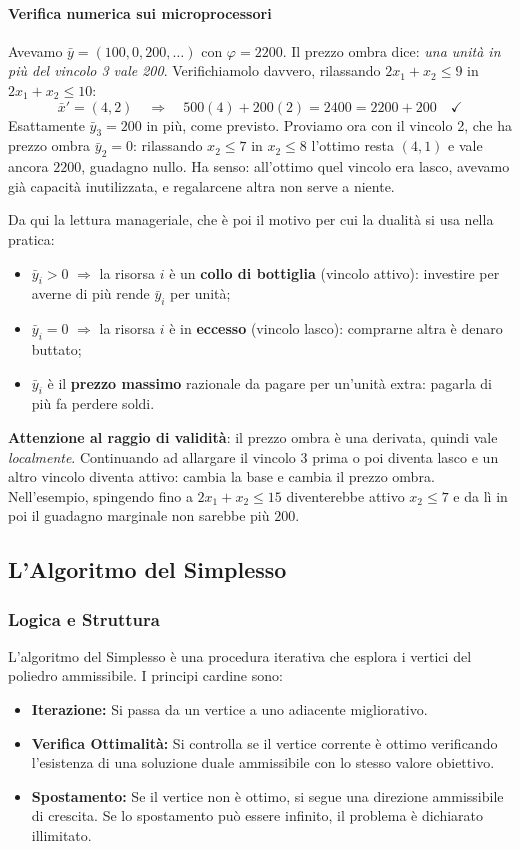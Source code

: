 \documentclass[12pt]{extarticle} %
\begin{document}
\paragraph{Verifica numerica sui microprocessori}
Avevamo $\bar{y} = (100, 0, 200, \dots)$ con $\varphi = 2200$. Il prezzo ombra dice: \emph{una unità in più del vincolo 3 vale 200}. Verifichiamolo davvero, rilassando $2x_1 + x_2 \le 9$ in $2x_1 + x_2 \le 10$:
\[
\bar{x}' = (4,2) \quad\Rightarrow\quad 500(4) + 200(2) = 2400 = 2200 + 200 \quad\checkmark
\]
Esattamente $\bar{y}_3 = 200$ in più, come previsto. Proviamo ora con il vincolo 2, che ha prezzo ombra $\bar{y}_2 = 0$: rilassando $x_2 \le 7$ in $x_2 \le 8$ l'ottimo resta $(4,1)$ e vale ancora $2200$, guadagno nullo. Ha senso: all'ottimo quel vincolo era lasco, avevamo già capacità inutilizzata, e regalarcene altra non serve a niente.

\noindent Da qui la lettura manageriale, che è poi il motivo per cui la dualità si usa nella pratica:
\begin{itemize}
    \item $\bar{y}_i > 0$ $\Rightarrow$ la risorsa $i$ è un \textbf{collo di bottiglia} (vincolo attivo): investire per averne di più rende $\bar{y}_i$ per unità;
    \item $\bar{y}_i = 0$ $\Rightarrow$ la risorsa $i$ è in \textbf{eccesso} (vincolo lasco): comprarne altra è denaro buttato;
    \item $\bar{y}_i$ è il \textbf{prezzo massimo} razionale da pagare per un'unità extra: pagarla di più fa perdere soldi.
\end{itemize}
\textbf{Attenzione al raggio di validità}: il prezzo ombra è una derivata, quindi vale \emph{localmente}. Continuando ad allargare il vincolo 3 prima o poi diventa lasco e un altro vincolo diventa attivo: cambia la base e cambia il prezzo ombra. Nell'esempio, spingendo fino a $2x_1+x_2 \le 15$ diventerebbe attivo $x_2 \le 7$ e da lì in poi il guadagno marginale non sarebbe più $200$.

\subsection{L'Algoritmo del Simplesso}

\subsubsection{Logica e Struttura}
L'algoritmo del Simplesso è una procedura iterativa che esplora i vertici del poliedro ammissibile. I principi cardine sono:
\begin{itemize}
    \item \textbf{Iterazione:} Si passa da un vertice a uno adiacente migliorativo.
    \item \textbf{Verifica Ottimalità:} Si controlla se il vertice corrente è ottimo verificando l'esistenza di una soluzione duale ammissibile con lo stesso valore obiettivo.
    \item \textbf{Spostamento:} Se il vertice non è ottimo, si segue una direzione ammissibile di crescita. Se lo spostamento può essere infinito, il problema è dichiarato illimitato.
\end{itemize}
\end{document}
